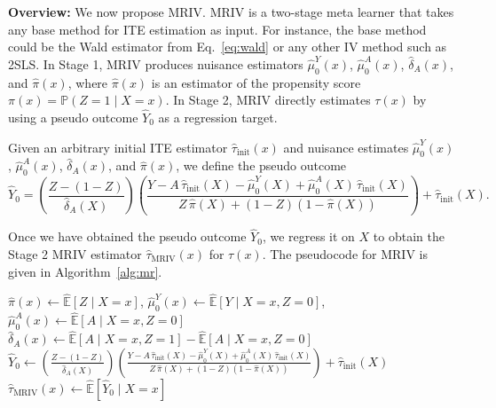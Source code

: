 \documentclass[nonatbib]{article}
\newcommand{\E}{\mathbb{E}}
\newcommand{\frameworkname}{MRIV\xspace}
\theoremstyle{definition}
\theoremstyle{plain}
\begin{document}
\textbf{Overview:} We now propose \frameworkname.  \frameworkname is a two-stage meta learner that takes any base method for ITE estimation as input. For instance, the base method could be the Wald estimator from Eq.~\eqref{eq:wald} or any other IV method such as 2SLS. In Stage 1, \frameworkname produces nuisance estimators $\hat{\mu}_0^Y(x)$, $\hat{\mu}_0^A(x)$, $\hat{\delta}_A(x)$, and $\hat{\pi}(x)$, where $\hat{\pi}(x)$ is an estimator of the propensity score $\pi(x) = \mathbb{P}(Z = 1 \mid X = x)$. In Stage 2, \frameworkname directly estimates $\tau(x)$ by using a pseudo outcome $\hat{Y}_0$ as a  regression target. 

Given an arbitrary initial ITE estimator $\hat{\tau}_{\mathrm{init}}(x)$ and nuisance estimates $\hat{\mu}_0^Y(x)$, $\hat{\mu}_0^A(x)$, $\hat{\delta}_A(x)$, and $\hat{\pi}(x)$, we define the pseudo outcome
\begin{equation}
\label{eq:pseudo_outcome}
    \hat{Y}_0 = \left(\frac{Z -(1-Z)}{\hat{\delta}_A(X)}\right) \left( \frac{Y - A \, \hat{\tau}_{\mathrm{init}}(X) - \hat{\mu}_0^Y(X) + \hat{\mu}_0^A(X) \, \hat{\tau}_{\mathrm{init}}(X)}{Z \, \hat{\pi}(X) + (1-Z) (1-\hat{\pi}(X))}\right) + \hat{\tau}_{\mathrm{init}}(X).
\end{equation}

Once we have obtained the pseudo outcome $\hat{Y}_0$, we regress it on $X$ to obtain the Stage 2 \frameworkname estimator $\hat{\tau}_{\mathrm{\frameworkname}}(x)$ for $\tau(x)$. The pseudocode for \frameworkname is given in Algorithm~\ref{alg:mr}.


\begin{algorithm}[H]
\DontPrintSemicolon
\caption{\frameworkname}
\label{alg:mr}
\footnotesize
$\hat{\pi}(x) \gets \hat{\E}[Z \mid X = x] $, \quad $\hat{\mu}_0^Y(x) \gets \hat{\E}[Y \mid X = x, Z = 0]$, \quad  $\hat{\mu}_0^A(x) \gets \hat{\E}[A \mid X = x, Z = 0]$\;
$\hat{\delta}_A(x) \gets \hat{\E}[A \mid X = x, Z = 1] - \hat{\E}[A \mid X = x, Z = 0]$\;
$\hat{Y}_0 \gets \left( \frac{Z -(1-Z)}{\hat{\delta}_A(X)} \right) \left(\frac{Y - A \, \hat{\tau}_{\mathrm{init}}(X) - \hat{\mu}_0^Y(X) + \hat{\mu}_0^A(X) \, \hat{\tau}_{\mathrm{init}}(X)}{Z \, \hat{\pi}(X) + (1-Z) (1-\hat{\pi}(X))} \right) +\hat{\tau}_{\mathrm{init}}(X)$\;
$\hat{\tau}_{\mathrm{MRIV}}(x) \gets \hat{\E}[\hat{Y}_0 \mid X = x] $
\end{algorithm}
\end{document}
